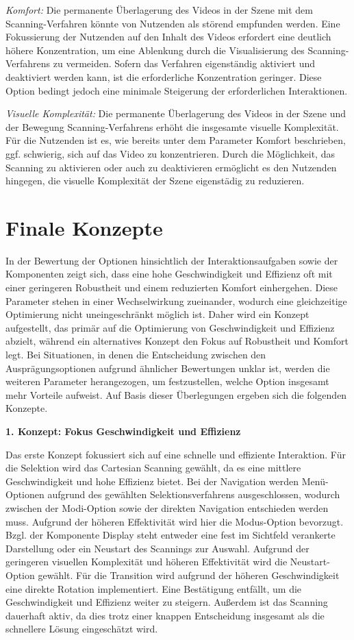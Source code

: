 \textit{Komfort:}
Die permanente Überlagerung des Videos in der Szene mit dem Scanning-Verfahren könnte von Nutzenden als störend empfunden werden. Eine Fokussierung der Nutzenden auf den Inhalt des Videos erfordert eine deutlich höhere Konzentration, um eine Ablenkung durch die Visualisierung des Scanning-Verfahrens zu vermeiden. Sofern das Verfahren eigenständig aktiviert und deaktiviert werden kann, ist die erforderliche Konzentration geringer. Diese Option bedingt jedoch eine minimale Steigerung der erforderlichen Interaktionen. 

\textit{Visuelle Komplexität:}
Die permanente Überlagerung des Videos in der Szene und der Bewegung Scanning-Verfahrens erhöht die insgesamte visuelle Komplexität. Für die Nutzenden ist es, wie bereits unter dem Parameter Komfort beschrieben, ggf. schwierig, sich auf das Video zu konzentrieren. Durch die Möglichkeit, das Scanning zu aktivieren oder auch zu deaktivieren ermöglicht es den Nutzenden hingegen, die visuelle Komplexität der Szene eigenstädig zu reduzieren. 

\section{Finale Konzepte}

In der Bewertung der Optionen hinsichtlich der Interaktionsaufgaben sowie der Komponenten zeigt sich, dass eine hohe Geschwindigkeit und Effizienz oft mit einer geringeren Robustheit und einem reduzierten Komfort einhergehen. Diese Parameter stehen in einer Wechselwirkung zueinander, wodurch eine gleichzeitige Optimierung nicht uneingeschränkt möglich ist. Daher wird ein Konzept aufgestellt, das primär auf die Optimierung von Geschwindigkeit und Effizienz abzielt, während ein alternatives Konzept den Fokus auf Robustheit und Komfort legt. Bei Situationen, in denen die Entscheidung zwischen den Ausprägungsoptionen aufgrund ähnlicher Bewertungen unklar ist, werden die weiteren Parameter herangezogen, um festzustellen, welche Option insgesamt mehr Vorteile aufweist. Auf Basis dieser Überlegungen ergeben sich die folgenden Konzepte.

{\normalfont \bfseries 1. Konzept: Fokus Geschwindigkeit und Effizienz} 

Das erste Konzept fokussiert sich auf eine schnelle und effiziente Interaktion. Für die Selektion wird das Cartesian Scanning gewählt, da es eine mittlere Geschwindigkeit und hohe Effizienz bietet. Bei der Navigation werden Menü-Optionen aufgrund des gewählten Selektionsverfahrens ausgeschlossen, wodurch zwischen der Modi-Option sowie der direkten Navigation entschieden werden muss. Aufgrund der höheren Effektivität wird hier die Modus-Option bevorzugt. Bzgl. der Komponente Display steht entweder eine fest im Sichtfeld verankerte Darstellung oder ein Neustart des Scannings zur Auswahl. Aufgrund der geringeren visuellen Komplexität und höheren Effektivität wird die Neustart-Option gewählt. Für die Transition wird aufgrund der höheren Geschwindigkeit eine direkte Rotation implementiert. Eine Bestätigung entfällt, um die Geschwindigkeit und Effizienz weiter zu steigern. Außerdem ist das Scanning dauerhaft aktiv, da dies trotz einer knappen Entscheidung insgesamt als die schnellere Lösung eingeschätzt wird. 


